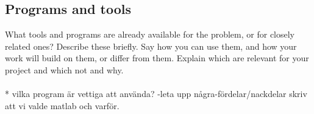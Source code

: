 \subsection{Programs and tools}
What tools and programs are already available for the problem, or for closely related ones?
Describe these briefly. Say how you can use them, and how your work will build on them, or differ from them. Explain which are relevant for your project and which not and why.
\\\\
* vilka program är vettiga att använda? -leta upp några-fördelar/nackdelar
skriv att vi valde matlab och varför.

